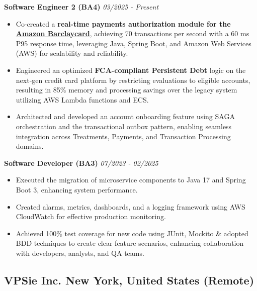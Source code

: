 \documentclass[a4,10pt]{article}
\newenvironment{zitemize}{
\begin{itemize}\itemsep0pt \parskip0pt \parsep1pt}
{\end{itemize}\vspace{-0.5cm}}
\begin{document}
\textbf{Software Engineer 2 (BA4)} \hfill \textit{03/2025 - Present} \\
\vspace{-5pt}
\begin{zitemize}
    \item Co-created a \textbf{real-time payments authorization module for the \href{https://www.amazon.co.uk/dp/B0BH98211K}{Amazon Barclaycard}}, achieving 70 transactions per second with a 60 ms P95 response time, leveraging Java, Spring Boot, and Amazon Web Services (AWS) for scalability and reliability.
    \item Engineered an optimized \textbf{FCA-compliant Persistent Debt} logic on the next-gen credit card platform by restricting evaluations to eligible accounts, resulting in 85\% memory and processing savings over the legacy system utilizing AWS Lambda functions and ECS.
    \item Architected and developed an account onboarding feature using SAGA orchestration and the transactional outbox pattern, enabling seamless integration across Treatments, Payments, and Transaction Processing domains.
\end{zitemize}

\vspace{8pt} 

\textbf{Software Developer (BA3)} \hfill \textit{07/2023 - 02/2025} \\
\vspace{-5pt}
\begin{zitemize}
    \item Executed the migration of microservice components to Java 17 and Spring Boot 3, enhancing system performance.
    \item Created alarms, metrics, dashboards, and a logging framework using AWS CloudWatch for effective production monitoring.
    \item Achieved 100\% test coverage for new code using JUnit, Mockito \& adopted BDD techniques to create clear feature scenarios, enhancing collaboration with developers, analysts, and QA teams.
\end{zitemize}


\subsection*{VPSie Inc. \hfill {\normalsize\normalfont New York, United States (Remote)}}
\end{document}
